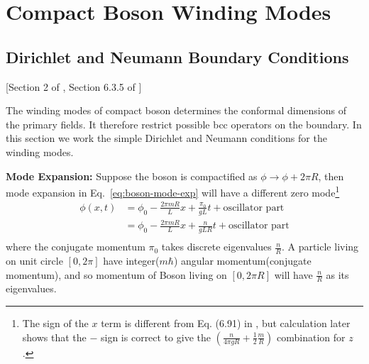 \documentclass{article}
\begin{document}



\section{Compact Boson Winding Modes}
\label{sec:winding}

\subsection{Dirichlet and Neumann Boundary Conditions}

[Section 2 of \cite{bachas_fusion_2008}, Section 6.3.5 of \cite{di_francesco_conformal_1997}]

The winding modes of compact boson determines the conformal dimensions of the primary fields. It therefore restrict possible bcc operators on the boundary. In this section we work the simple Dirichlet and Neumann conditions for the winding modes.

{\bf Mode Expansion:} 
Suppose the boson is compactified as $\phi \rightarrow \phi + 2\pi R$, then mode expansion in Eq.~\ref{eq:boson-mode-exp} will have a different zero mode\footnote{The sign of the $x$ term is different from Eq. (6.91) in \cite{di_francesco_conformal_1997}, but calculation later shows that the $-$ sign is correct to give the $(\frac{n}{4\pi gR} + \frac{1}{2} \frac{m}{R})$ combination for $z$. }  
\begin{equation}
\begin{aligned}
\phi( x, t ) &= \phi_0 - \frac{2\pi m R}{L}x + \frac{\pi_0}{gL} t  + \text{oscillator part}  \\
&= \phi_0 - \frac{2\pi m R}{L}x + \frac{n}{gLR} t  + \text{oscillator part}  \\
\end{aligned}
\end{equation}
where the conjugate momentum $\pi_0$ takes discrete eigenvalues $\frac{n}{R}$. A particle living on unit circle $[0, 2\pi]$ have integer($m \hbar$) angular momentum(conjugate momentum), and so momentum of Boson living on $[0, 2\pi R]$ will have $\frac{n}{R}$ as its eigenvalues. 
\end{document}
